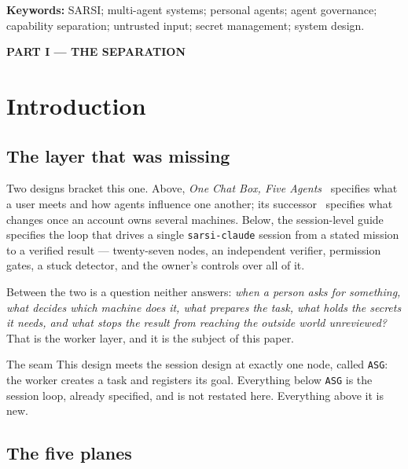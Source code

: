 \documentclass[11pt]{article}
\newcommand{\code}[1]{\texttt{\small #1}}
\begin{document}
\vspace{2pt}
\noindent\textbf{Keywords:} SARSI; multi-agent systems; personal agents; agent governance; capability separation; untrusted input; secret management; system design.

\tableofcontents

\newpage
\begin{center}\large\bfseries PART I --- THE SEPARATION\end{center}

\section{Introduction}
\label{sec:intro}

\subsection{The layer that was missing}

Two designs bracket this one. Above, \emph{One Chat Box, Five Agents}~\citep{yang2026console} specifies what a user meets and how agents influence one another; its successor~\citep{yang2026account} specifies what changes once an account owns several machines. Below, the session-level guide specifies the loop that drives a single \code{sarsi-claude} session from a stated mission to a verified result --- twenty-seven nodes, an independent verifier, permission gates, a stuck detector, and the owner's controls over all of it.

Between the two is a question neither answers: \emph{when a person asks for something, what decides which machine does it, what prepares the task, what holds the secrets it needs, and what stops the result from reaching the outside world unreviewed?} That is the worker layer, and it is the subject of this paper.

\begin{notebox}{The seam}
This design meets the session design at exactly one node, called \code{ASG}: the worker creates a task and registers its goal. Everything below \code{ASG} is the session loop, already specified, and is not restated here. Everything above it is new.
\end{notebox}

\subsection{The five planes}
\end{document}
